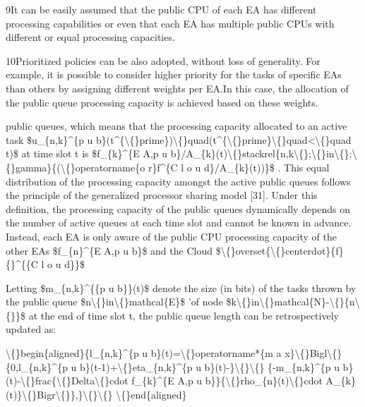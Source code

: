 \documentclass{article}
\begin{document}
9It can be easily assumed that the public CPU of each EA has different processing capabilities or even that each EA has multiple public CPUs with different or equal processing capacities.

10Prioritized policies can be also adopted, without loss of generality. For example, it is possible to consider higher priority for the tasks of specific EAs than others by assigning different weights per EA.In this case, the allocation of the public queue processing capacity is achieved based on these weights.

public queues, which means that the processing capacity allocated to an active task \$u\_\{n,k\}\textasciicircum{}\{p u b\}(t\textasciicircum{}\{\textbackslash\{\}prime\})\textbackslash\{\}quad(t\textasciicircum{}\{\textbackslash\{\}prime\}\textbackslash\{\}quad<\textbackslash\{\}quad t)\$ at time slot t is \$f\_\{k\}\textasciicircum{}\{E A,p u b\}/A\_\{k\}(t)\textbackslash\{\}stackrel\{n,k\textbackslash\{\};\textbackslash\{\}in\textbackslash\{\};\textbackslash\{\}gamma\}\{(\textbackslash\{\}operatorname\{o r\}f\textasciicircum{}\{C l o u d\}/A\_\{k\}(t))\}\$ . This equal distribution of the processing capacity amongst the active public queues follows the principle of the generalized processor sharing model [31]. Under this definition, the processing capacity of the public queues dynamically depends on the number of active queues at each time slot and cannot be known in advance. Instead, each EA is only aware of the public CPU processing capacity of the other EAs \$f\_\{n\}\textasciicircum{}\{E A,p u b\}\$ and the Cloud 
\$\textbackslash\{\}overset\{\textbackslash\{\}centerdot\}\{f\}\{\}\textasciicircum{}\{\{C l o u d\}\}\$

Letting \$m\_\{n,k\}\textasciicircum{}\{\{p u b\}\}(t)\$ denote the size (in bits) of the tasks thrown by the public queue \$n\textbackslash\{\}in\textbackslash\{\}mathcal\{E\}\$ 'of node \$k\textbackslash\{\}in\textbackslash\{\}mathcal\{N\}-\textbackslash\{\}\{n\textbackslash\{\}\}\$ at the end of time slot t, the public queue length can be retrospectively updated as:

\textbackslash\{\}begin\{aligned\}\{l\_\{n,k\}\textasciicircum{}\{p u b\}(t)=\textbackslash\{\}operatorname*\{m a x\}\textbackslash\{\}Bigl\textbackslash\{\}\{0,l\_\{n,k\}\textasciicircum{}\{p u b\}(t-1)+\textbackslash\{\}eta\_\{n,k\}\textasciicircum{}\{p u b\}(t)-\}\textbackslash\{\}\textbackslash\{\} \{-m\_\{n,k\}\textasciicircum{}\{p u b\}(t)-\textbackslash\{\}frac\{\textbackslash\{\}Delta\textbackslash\{\}cdot f\_\{k\}\textasciicircum{}\{E A,p u b\}\}\{\textbackslash\{\}rho\_\{n\}(t)\textbackslash\{\}cdot A\_\{k\}(t)\}\textbackslash\{\}Bigr\textbackslash\{\}\},\}\textbackslash\{\}\textbackslash\{\} \textbackslash\{\}end\{aligned\}
\end{document}
